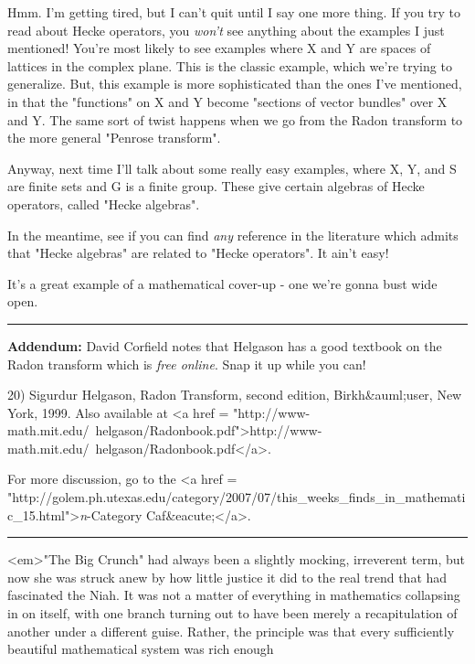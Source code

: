 Hmm.  I'm getting tired, but I can't quit until I say one more
thing.  If you try to read about Hecke operators, you \emph{won't}
see anything about the examples I just mentioned!  You're most
likely to see examples where X and Y are spaces of lattices in
the complex plane.  This is the classic example, which we're
trying to generalize.  But, this example is more sophisticated
than the ones I've mentioned, in that the "functions" on X and
Y become "sections of vector bundles" over X and Y.  The same
sort of twist happens when we go from the Radon transform to the
more general "Penrose transform".

Anyway, next time I'll talk about some really easy examples,
where X, Y, and S are finite sets and G is a finite group.
These give certain algebras of Hecke operators, called "Hecke
algebras".

In the meantime, see if you can find \emph{any} reference in the 
literature which admits that "Hecke algebras" are related
to "Hecke operators".  It ain't easy!  

It's a great example of a mathematical cover-up - one we're gonna
bust wide open.

\par\noindent\rule{\textwidth}{0.4pt}
\textbf{Addendum:} David Corfield notes that Helgason has a good
textbook on the Radon transform which is \emph{free online}.
Snap it up while you can!

20) Sigurdur Helgason, Radon Transform, second edition, Birkh&auml;user,
New York, 1999.
Also available at <a href = "http://www-math.mit.edu/~helgason/Radonbook.pdf">http://www-math.mit.edu/~helgason/Radonbook.pdf</a>.


For more discussion, go to the 
<a href = "http://golem.ph.utexas.edu/category/2007/07/this_weeks_finds_in_mathematic_15.html">\emph{n}-Category Caf&eacute;</a>.

\par\noindent\rule{\textwidth}{0.4pt}
<em>"The Big Crunch" had always been a slightly mocking,
irreverent term, but now she was struck anew by how little justice it
did to the real trend that had fascinated the Niah.  It was not a matter
of everything in mathematics collapsing in on itself, with one branch 
turning out to have been merely a recapitulation of another under a
different guise.  Rather, the principle was that
every sufficiently beautiful mathematical system was rich enough


